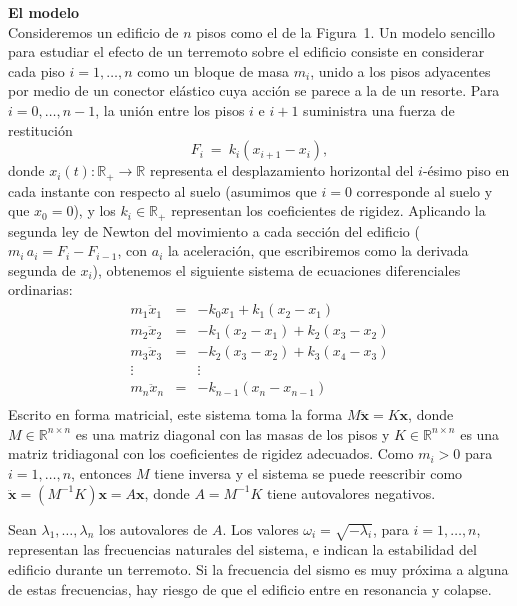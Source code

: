 \documentclass[a4paper]{article}
\begin{document}
\textbf{El modelo}\\
Consideremos un edificio de $n$ pisos como el de la Figura~1. Un modelo sencillo
para estudiar el efecto de un terremoto sobre el edificio consiste en
considerar cada piso $i=1,\dots,n$ como un bloque de masa $m_i$, unido a los
pisos adyacentes por medio de un conector el\'astico cuya acci\'on se parece
a la de un resorte. Para $i=0,\dots,n-1$, la uni\'on entre los pisos $i$ e
$i+1$ suministra una fuerza de restituci\'on
\begin{displaymath}
F_i\ =\ k_i (x_{i+1}-x_i),
\end{displaymath}
donde $x_i(t)\colon \mathbb{R}_+ \rightarrow \mathbb{R}$ representa el desplazamiento
horizontal del $i$-\'esimo piso en cada instante con respecto al suelo (asumimos que $i=0$ corresponde
al suelo y que $x_0=0$), y los $k_i\in\mathbb{R}_+$ representan los coeficientes
de rigidez. Aplicando la segunda ley de Newton del movimiento %
a cada secci\'on del edificio ($m_i\, a_i = F_i-F_{i-1}$, con $a_i$ la aceleraci\'on, que escribiremos como la derivada segunda de $x_i$), 
obtenemos el siguiente sistema de ecuaciones diferenciales ordinarias:
\begin{eqnarray*}
m_1 \ddot{x}_1 & = & -k_0 x_1 + k_1 (x_2-x_1) \nonumber \\
m_2 \ddot{x}_2 & = & -k_1 (x_2-x_1) + k_2 (x_3-x_2) \nonumber \\
m_3 \ddot{x}_3 & = & -k_2 (x_3-x_2) + k_3 (x_4-x_3) \nonumber \\
\vdots &  & \vdots \nonumber \\
m_n \ddot{x}_n & = & -k_{n-1} (x_n-x_{n-1}) \nonumber \\
\end{eqnarray*}
Escrito en forma matricial, este
sistema toma la forma $M\ddot{\mathbf{x}} = K\mathbf{x}$, 
donde $M\in\mathbb{R}^{n\times n}$ es una matriz
diagonal con las masas de los pisos y $K\in\mathbb{R}^{n\times n}$ es una matriz
tridiagonal con los coeficientes de rigidez adecuados. Como $m_i>0$ para
$i=1,\dots,n$, entonces $M$ tiene inversa y el sistema se puede reescribir
como $\ddot{\mathbf{x}} = (M^{-1} K) \mathbf{x} = A\mathbf{x}$, donde $A = M^{-1} K$ tiene autovalores negativos.

Sean $\lambda_1,\dots,\lambda_n$ los autovalores de $A$. Los valores
$\omega_i=\sqrt{-\lambda_i}$, para $i=1,\dots,n$, representan las frecuencias
naturales del sistema, e indican la estabilidad del edificio durante un
terremoto. Si la frecuencia del sismo es muy pr\'oxima a alguna de estas
frecuencias, hay riesgo de que el edificio entre en resonancia y colapse.\\
\end{document}
